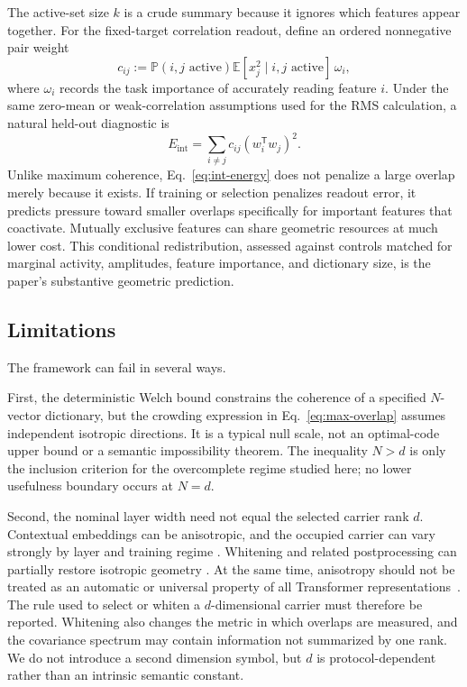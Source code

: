 \documentclass[
  aps,
  reprint,
  superscriptaddress,
  floatfix,
  nofootinbib,
  longbibliography
]{revtex4-2}
\newcommand{\E}{\mathbb{E}}
\newcommand{\Prob}{\mathbb{P}}
\newcommand{\Eint}{E_{\mathrm{int}}}
\newcommand{\T}{^{\mathsf{T}}}
\begin{document}
The active-set size $k$ is a crude summary because it ignores which features
appear together.  For the fixed-target correlation readout, define an ordered
nonnegative pair weight
%
\begin{equation}
\label{eq:coactivation}
c_{ij}:=\Prob(i,j\text{ active})
\E[x_j^2\mid i,j\text{ active}]\,\omega_i,
\end{equation}
%
where $\omega_i$ records the task importance of accurately reading feature
$i$.  Under the same zero-mean or weak-correlation assumptions used for the
RMS calculation, a natural held-out diagnostic is
%
\begin{equation}
\label{eq:int-energy}
\Eint=
\sum_{i\neq j}
c_{ij}(w_i\T w_j)^2 .
\end{equation}
%
Unlike maximum coherence, Eq.~\eqref{eq:int-energy} does not penalize a large
overlap merely because it exists.  If training or selection penalizes readout
error, it predicts pressure toward smaller overlaps specifically for important
features that coactivate.  Mutually exclusive features can share geometric
resources at much lower cost.  This conditional redistribution, assessed
against controls matched for marginal activity, amplitudes, feature
importance, and dictionary size, is the paper's substantive geometric
prediction.

\subsection{Limitations}
\label{sec:limitations}

The framework can fail in several ways.

First, the deterministic Welch bound constrains the coherence of a specified
$N$-vector dictionary, but the crowding expression in
Eq.~\eqref{eq:max-overlap} assumes independent isotropic directions.  It is a
typical null scale, not an optimal-code upper bound or a semantic impossibility
theorem.  The inequality $N>d$ is only the inclusion criterion for the
overcomplete regime studied here; no lower usefulness boundary occurs at
$N=d$.

Second, the nominal layer width need not equal the selected carrier rank $d$.
Contextual embeddings can be anisotropic, and the occupied carrier can vary
strongly by layer and training regime
\cite{ethayarajh2019,gao2019representation,mu2018allbutthetop,razzhigaev2024shape}. Whitening and
related postprocessing can partially restore isotropic geometry
\cite{gao2019representation,mu2018allbutthetop,su2021whitening}. At the same time, anisotropy should not
be treated as an automatic or universal property of all Transformer
representations~\cite{machina2024anisotropy}. The rule used to select or
whiten a $d$-dimensional carrier must therefore be reported. Whitening also
changes the metric in which overlaps are measured, and the covariance spectrum
may contain information not summarized by one rank. We do not introduce a
second dimension symbol, but $d$ is protocol-dependent rather than an
intrinsic semantic constant.
\end{document}
